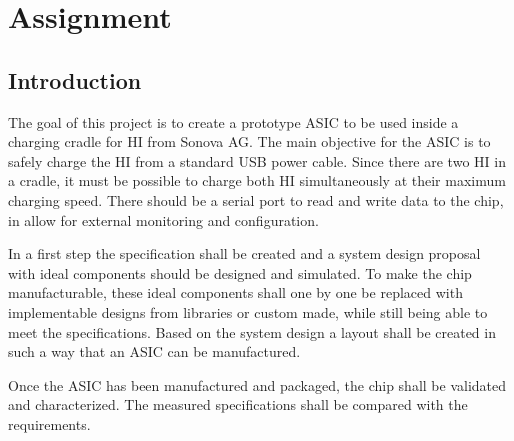 
%
%

%
\section{Assignment}
\label{chap:assignment}
\subsection{Introduction}

The goal of this project is to create a prototype \ac{ASIC} to be used inside a charging cradle for \ac{HI} from Sonova AG. The main objective for the \ac{ASIC} is to safely charge the \ac{HI} from a standard USB power cable. Since there are two \ac{HI} in a cradle, it must be possible to charge both \ac{HI} simultaneously at their maximum charging speed. There should be a serial port to read and write data to the chip, in allow for external monitoring and configuration. \newline

In a first step the specification shall be created and a system design proposal with ideal components should be designed and simulated. To make the chip manufacturable, these ideal components shall one by one be replaced with implementable designs from libraries or custom made, while still being able to meet the specifications. Based on the system design a layout shall be created in such a way that an \ac{ASIC} can be manufactured.\newline

Once the \ac{ASIC} has been manufactured and packaged, the chip shall be validated and characterized. The measured specifications shall be compared with the requirements. 

